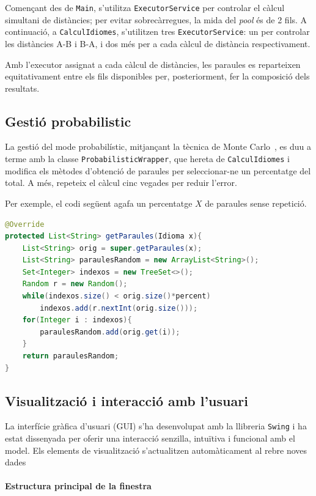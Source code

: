 \documentclass{ieeetj}
\begin{document}
Començant des de \texttt{Main}, s’utilitza \texttt{ExecutorService} per controlar el càlcul simultani de distàncies; per evitar sobrecàrregues, la mida del \emph{pool} és de 2 fils. A continuació, a \texttt{CalculIdiomes}, s’utilitzen tres \texttt{ExecutorService}: un per controlar les distàncies A-B i B-A, i dos més per a cada càlcul de distància respectivament.\newline

Amb l’executor assignat a cada càlcul de distàncies, les paraules es reparteixen equitativament entre els fils disponibles per, posteriorment, fer la composició dels resultats.


\subsection{Gestió probabilistic}
La gestió del mode probabilístic, mitjançant la tècnica de Monte Carlo~\cite{Montecarlo}, es duu a terme amb la classe \texttt{ProbabilisticWrapper}, que hereta de \texttt{CalculIdiomes} i modifica els mètodes d’obtenció de paraules per seleccionar-ne un percentatge del total. A més, repeteix el càlcul cinc vegades per reduir l’error.

Per exemple, el codi següent agafa un percentatge $X$ de paraules sense repetició.

\begin{lstlisting}[language=Java]
@Override
protected List<String> getParaules(Idioma x){
    List<String> orig = super.getParaules(x);
    List<String> paraulesRandom = new ArrayList<String>();
    Set<Integer> indexos = new TreeSet<>();
    Random r = new Random();
    while(indexos.size() < orig.size()*percent)
        indexos.add(r.nextInt(orig.size()));
    for(Integer i : indexos){
        paraulesRandom.add(orig.get(i));
    }
    return paraulesRandom;
}
\end{lstlisting}

\subsection{Visualització i interacció amb l'usuari}
La interfície gràfica d’usuari (GUI) s’ha desenvolupat amb la llibreria \texttt{Swing} i ha estat dissenyada per oferir una interacció senzilla, intuïtiva i funcional amb el model.
Els elements de visualització s'actualitzen automàticament al rebre noves dades

\paragraph{Estructura principal de la finestra}
\end{document}
